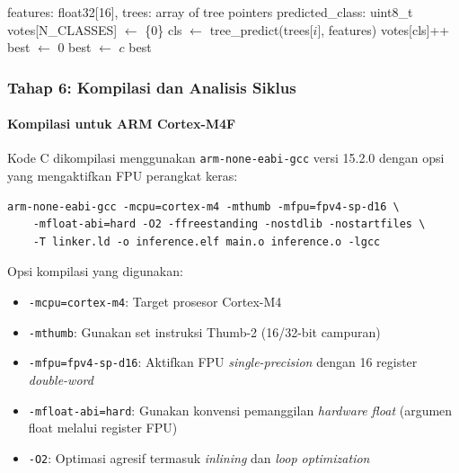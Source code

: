 \begin{algorithm}[htbp]
\caption{Inferensi Ensemble (Varian Voting)}
\label{alg:arm_ensemble}
\begin{algorithmic}[1]
\REQUIRE features: float32[16], trees: array of tree pointers
\ENSURE predicted\_class: uint8\_t
\STATE votes[N\_CLASSES] $\leftarrow$ \{0\}
    \STATE cls $\leftarrow$ tree\_predict(trees[$i$], features)
    \STATE votes[cls]++
\ENDFOR
\STATE best $\leftarrow$ 0
        \STATE best $\leftarrow$ $c$
    \ENDIF
\ENDFOR
\RETURN best
\end{algorithmic}
\end{algorithm}

\subsubsection{Tahap 6: Kompilasi dan Analisis Siklus}

\paragraph{Kompilasi untuk ARM Cortex-M4F}
Kode C dikompilasi menggunakan \texttt{arm-none-eabi-gcc} versi 15.2.0 dengan opsi yang mengaktifkan FPU perangkat keras:

\begin{verbatim}
arm-none-eabi-gcc -mcpu=cortex-m4 -mthumb -mfpu=fpv4-sp-d16 \
    -mfloat-abi=hard -O2 -ffreestanding -nostdlib -nostartfiles \
    -T linker.ld -o inference.elf main.o inference.o -lgcc
\end{verbatim}

Opsi kompilasi yang digunakan:
\begin{itemize}
    \item \texttt{-mcpu=cortex-m4}: Target prosesor Cortex-M4
    \item \texttt{-mthumb}: Gunakan set instruksi Thumb-2 (16/32-bit campuran)
    \item \texttt{-mfpu=fpv4-sp-d16}: Aktifkan FPU \textit{single-precision} dengan 16 register \textit{double-word}
    \item \texttt{-mfloat-abi=hard}: Gunakan konvensi pemanggilan \textit{hardware float} (argumen float melalui register FPU)
    \item \texttt{-O2}: Optimasi agresif termasuk \textit{inlining} dan \textit{loop optimization}
\end{itemize}


